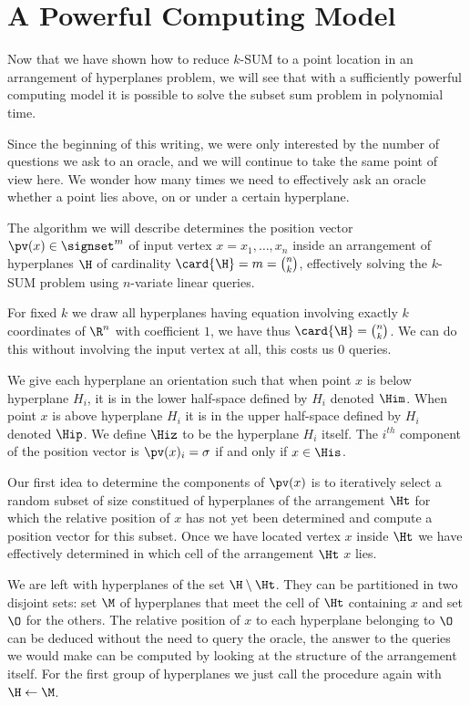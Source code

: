 \section{A Powerful Computing Model}

Now that we have shown how to reduce $k$-SUM to a point location in an
arrangement of hyperplanes problem, we will see that with a sufficiently
powerful computing model it is possible to solve the subset sum problem in
polynomial time.

Since the beginning of this writing, we were only interested by the number of
questions we ask to an oracle, and we will continue to take the same point of
view here. We wonder how many times we need to effectively ask an oracle
whether a point lies above, on or under a certain hyperplane.

The algorithm we will describe determines the position vector $\pv(x) \in
\signset^{m}$ of input vertex $x = {x_1, \dots, x_n}$ inside an
arrangement of hyperplanes $\H$ of cardinality $\card{\H} = m = \binom{n}{k}$, effectively
solving the $k$-SUM problem using  $n$-variate linear
queries.

For fixed $k$ we draw all hyperplanes having equation involving exactly $k$
coordinates of $\R^n$ with coefficient $1$, we have thus $\card{\H} =
\binom{n}{k}$. We can do this without involving the input vertex at all, this
costs us $0$ queries.

We give each hyperplane an orientation such that when point $x$ is below
hyperplane $H_i$, it is in the lower half-space defined by $H_i$ denoted
$\Him$. When point $x$ is above hyperplane $H_i$ it is in the upper
half-space defined by $H_i$ denoted $\Hip$. We define $\Hiz$ to be the
hyperplane $H_i$ itself. The $i^{th}$ component of the position vector is
$\pv(x)_i = \sigma$ if and only if $x \in \His$.

Our first idea to determine the components of $\pv(x)$ is to iteratively
select a random subset of size  constitued of hyperplanes of the
arrangement $\Ht$ for which the relative position of $x$ has not yet been
determined and compute a position vector for this subset. Once we have located
vertex $x$ inside $\Ht$ we have effectively determined in
which cell of the arrangement $\Ht$ $x$ lies.

We are left with hyperplanes of the set $\H \setminus \Ht$. They can be
partitioned in two disjoint sets: set $\M$ of hyperplanes that meet the cell of
$\Ht$ containing $x$ and set $\O$ for the others. The relative position of $x$
to each hyperplane belonging to $\O$ can be deduced without the need to query
the oracle, the answer to the queries we would make can be computed by looking
at the structure of the arrangement itself. For the first group of hyperplanes
we just call the procedure again with $\H \gets \M$.

